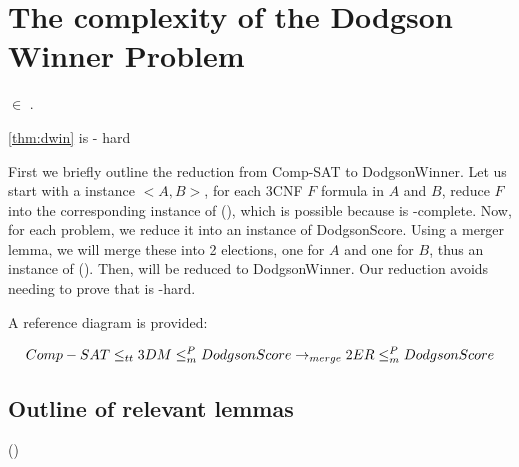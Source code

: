 \section{The complexity of the Dodgson Winner Problem}

\begin{theorem}
     $\in$ \tp.
\end{theorem}

\begin{claimproof}

\end{claimproof}

\begin{theorem}\ref{thm:dwin}
     is \tp- hard
\end{theorem}

    First we briefly outline the reduction from Comp-SAT to
DodgsonWinner.
Let us start with a \csat instance $<A,B>$, for each 3CNF $F$
formula in $A$ and $B$, reduce $F$ into the corresponding instance of
 (), which is possible because
 is \np-complete.
Now, for each  problem, we reduce it into an instance of DodgsonScore.
Using a merger lemma, we will merge these into 2 elections, one for $A$
and one for $B$, thus an instance of  ().
Then,  will be reduced to DodgsonWinner.
Our reduction avoids needing to prove that  is \tp-hard.

A reference diagram is provided:

\[{\sc Comp-SAT} \le_{tt} {\sc 3DM} \le_m^P {\sc DodgsonScore} \rightarrow_{merge}
{\sc 2ER} \le_m^P {\sc DodgsonScore}\]

\subsection{Outline of relevant lemmas}

\begin{lemma}{3.4} \label{lem:red1}

\end{lemma}

\begin{lemma}{3.5}
\end{lemma}

\begin{problem}{ ()}
    
\end{problem}

